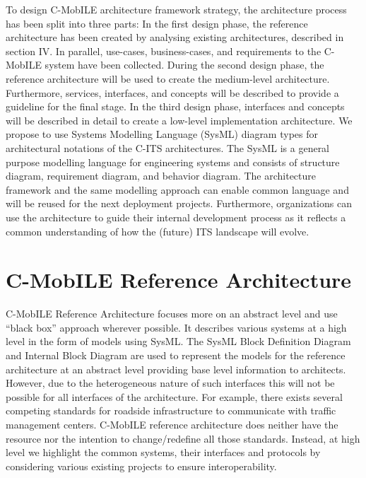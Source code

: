 \documentclass[conference]{IEEEtran}
\begin{document}
To design C-MobILE architecture framework strategy, the architecture process has been split into three parts: In the first design phase, the reference architecture has been created by analysing existing architectures, described in section IV. In parallel, use-cases, business-cases, and requirements to the C-MobILE system have been collected. During the second design phase, the reference architecture will be used to create the medium-level architecture. Furthermore, services, interfaces, and concepts will be described to provide a guideline for the final stage. In the third design phase, interfaces and concepts will be described in detail to create a low-level implementation architecture. We propose to use Systems Modelling Language (SysML) diagram types for architectural notations of the C-ITS architectures. The SysML is a general purpose modelling language for engineering systems and consists of structure diagram, requirement diagram, and behavior diagram. The architecture framework and the same modelling approach can enable common language and will be reused for the next deployment projects. Furthermore, organizations can use the architecture to guide their internal development process as it reflects a common understanding of how the (future) ITS landscape will evolve.


\section{C-MobILE Reference Architecture}

C-MobILE Reference Architecture focuses more on an abstract level and use “black box” approach wherever possible. It describes various systems at a high level in the form of models using SysML. The SysML Block Definition Diagram and Internal Block Diagram are used to represent the models for the reference architecture at an abstract level providing base level information to architects. However, due to the heterogeneous nature of such interfaces this will not be possible for all interfaces of the architecture. For example, there exists several competing standards for roadside infrastructure to communicate with traffic management centers. C-MobILE reference architecture does neither have the resource nor the intention to change/redefine all those standards. Instead, at high level we highlight the common systems, their interfaces and protocols by considering various existing projects to ensure interoperability.  
\end{document}
